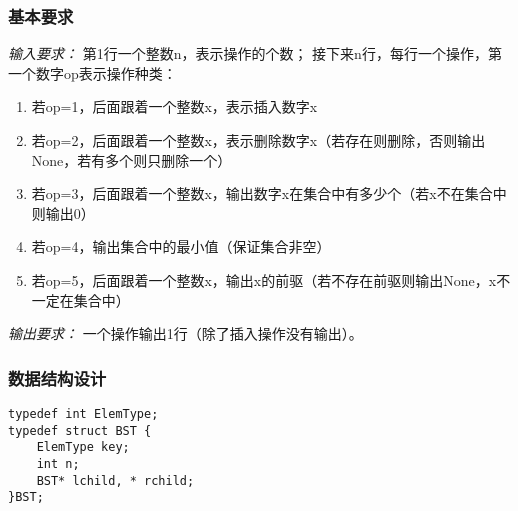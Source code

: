 \documentclass[a4paper,11pt]{article}%
\newenvironment{shadedquotation}
 {\begin{shaded*}
  \quoting[leftmargin=0pt, vskip=0pt]
 }
 {\endquoting
 \end{shaded*}
}
\begin{document}
\subsubsection{基本要求}
\begin{shadedquotation}
    \emph{输入要求：}
    第1行一个整数n，表示操作的个数；
接下来n行，每行一个操作，第一个数字op表示操作种类：
\begin{enumerate}
    \item 若op=1，后面跟着一个整数x，表示插入数字x
    \item 若op=2，后面跟着一个整数x，表示删除数字x（若存在则删除，否则输出None，若有多个则只删除一个）
    \item 若op=3，后面跟着一个整数x，输出数字x在集合中有多少个（若x不在集合中则输出0）
    \item 若op=4，输出集合中的最小值（保证集合非空）
    \item 若op=5，后面跟着一个整数x，输出x的前驱（若不存在前驱则输出None，x不一定在集合中）
\end{enumerate}
\end{shadedquotation}
\begin{shadedquotation}
    \emph{输出要求：}
    一个操作输出1行（除了插入操作没有输出）。
\end{shadedquotation}
\subsubsection{数据结构设计}
\begin{lstlisting}[language={[ANSI]C},keywordstyle=\color{blue!70},commentstyle=\color{red!50!green!50!blue!50},frame=shadowbox,
				rulesepcolor=\color{red!20!green!20!blue!20}]
typedef int ElemType;
typedef struct BST {
    ElemType key;
    int n;
    BST* lchild, * rchild;
}BST;
\end{lstlisting}
\end{document}
